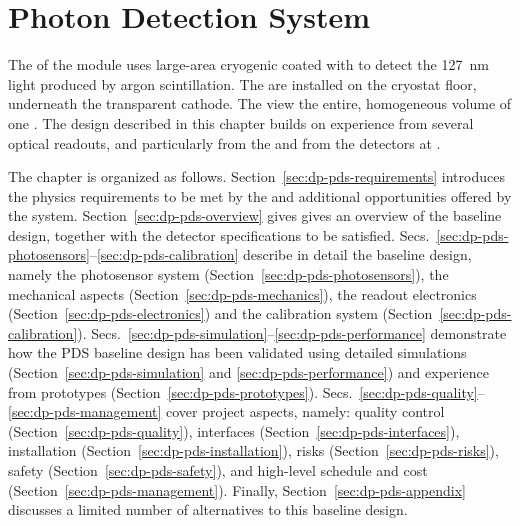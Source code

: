 \chapter{Photon Detection System}
\label{ch:dp-pds}

The  of the   module uses large-area cryogenic  coated with  to detect the \SI{127}{\nm} light produced by argon scintillation. The  are installed on the cryostat floor, underneath the  transparent cathode. The   view the entire, homogeneous  volume of one . The design described in this chapter builds on experience from several  optical readouts, and particularly from the  and from the  detectors at . 

The chapter is organized as follows. Section~\ref{sec:dp-pds-requirements} introduces the physics requirements to be met by the  and additional opportunities offered by the system. Section~\ref{sec:dp-pds-overview} gives gives an overview of the  baseline design, together with the detector specifications to be satisfied. Secs.~\ref{sec:dp-pds-photosensors}--\ref{sec:dp-pds-calibration} describe in detail the  baseline design, namely the  photosensor system (Section~\ref{sec:dp-pds-photosensors}), the mechanical aspects (Section~\ref{sec:dp-pds-mechanics}),  the readout electronics (Section~\ref{sec:dp-pds-electronics}) and the calibration system (Section~\ref{sec:dp-pds-calibration}). Secs.~\ref{sec:dp-pds-simulation}--\ref{sec:dp-pds-performance} demonstrate how the PDS baseline design has been validated using detailed simulations (Section~\ref{sec:dp-pds-simulation} and \ref{sec:dp-pds-performance}) and experience from prototypes (Section~\ref{sec:dp-pds-prototypes}). Secs.~\ref{sec:dp-pds-quality}--\ref{sec:dp-pds-management} cover  project aspects, namely: quality control (Section~\ref{sec:dp-pds-quality}), interfaces (Section~\ref{sec:dp-pds-interfaces}), installation (Section~\ref{sec:dp-pds-installation}), risks (Section~\ref{sec:dp-pds-risks}), safety (Section~\ref{sec:dp-pds-safety}), and high-level schedule and cost (Section~\ref{sec:dp-pds-management}). Finally, Section~\ref{sec:dp-pds-appendix} discusses a limited number of alternatives to this baseline design.  
















